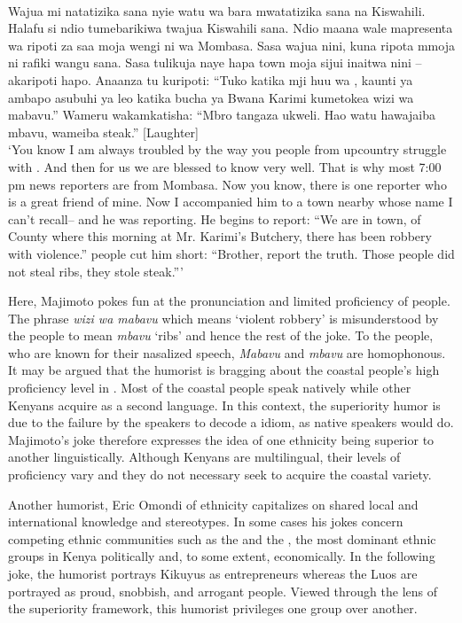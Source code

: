 \documentclass[output=paper]{langsci/langscibook}
\begin{document}
 \\
\smallskip
Wajua mi natatizika sana nyie watu wa bara mwatatizika sana na Kiswahili. Halafu si ndio tumebarikiwa twajua Kiswahili sana. Ndio maana wale mapresenta wa ripoti za saa moja wengi ni wa Mombasa. Sasa wajua nini, kuna ripota mmoja ni rafiki wangu sana. Sasa tulikuja naye hapa town moja sijui inaitwa nini – akaripoti hapo. Anaanza tu kuripoti: “Tuko katika mji huu wa , kaunti ya  ambapo asubuhi ya leo katika bucha ya Bwana Karimi kumetokea wizi wa mabavu.” Wameru wakamkatisha: “Mbro tangaza ukweli. Hao watu hawajaiba mbavu, wameiba steak.” \textup{[Laughter]} \\
\glt ‘You know I am always troubled by the way you people from upcountry struggle with . And then for us we are blessed to know  very well. That is why most 7:00 pm news reporters are from Mombasa. Now you know, there is one reporter who is a great friend of mine. Now I accompanied him to a town nearby whose name I can’t recall– and he was reporting. He begins to report: “We are in  town, of  County where this morning at Mr. Karimi’s Butchery, there has been robbery with violence.”  people cut him short: “Brother, report the truth. Those people did not steal ribs, they stole steak.”’ \citep{Churchill2015Wajua}
\z

Here, Majimoto pokes fun at the pronunciation and limited  proficiency of  people. The phrase \textit{wizi wa mabavu} which means ‘violent robbery’ is misunderstood by the  people to mean \textit{mbavu} ‘ribs’ and hence the rest of the joke. To the  people, who are known for their nasalized speech, \textit{Mabavu} and \textit{mbavu} are homophonous. It may be argued that the humorist is bragging about the coastal people’s high proficiency level in . Most of the coastal people speak  natively while other Kenyans acquire  as a second language. In this context, the superiority humor is due to the failure by the  speakers to decode a  idiom, as native speakers would do. Majimoto’s joke therefore expresses the idea of one ethnicity being superior to another linguistically. Although Kenyans are multilingual, their levels of proficiency vary and they do not necessary seek to acquire the coastal  variety.

Another humorist, Eric Omondi of  ethnicity capitalizes on shared local and international knowledge and stereotypes. In some cases his jokes concern competing ethnic communities such as the  and the , the most dominant ethnic groups in Kenya politically and, to some extent, economically. In the following joke, the humorist portrays Kikuyus as entrepreneurs whereas the Luos are portrayed as proud, snobbish, and arrogant people. Viewed through the lens of the superiority framework, this humorist privileges one group over another. 
 
\end{document}
